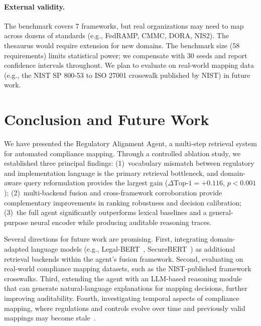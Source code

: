 \documentclass{sn-jnl}
\begin{document}
\paragraph{External validity.}
The benchmark covers 7 frameworks, but real organizations may need to map across dozens of standards (e.g., FedRAMP, CMMC, DORA, NIS2).
The thesaurus would require extension for new domains.
The benchmark size (58 requirements) limits statistical power; we compensate with 30 seeds and report confidence intervals throughout.
We plan to evaluate on real-world mapping data (e.g., the NIST SP 800-53 to ISO 27001 crosswalk published by NIST) in future work.


\section{Conclusion and Future Work}
\label{sec:conclusion}

We have presented the Regulatory Alignment Agent, a multi-step retrieval system for automated compliance mapping.
Through a controlled ablation study, we established three principal findings:
(1)~vocabulary mismatch between regulatory and implementation language is the primary retrieval bottleneck, and domain-aware query reformulation provides the largest gain ($\Delta\text{Top-1} = +0.116$, $p < 0.001$);
(2)~multi-backend fusion and cross-framework corroboration provide complementary improvements in ranking robustness and decision calibration;
(3)~the full agent significantly outperforms lexical baselines and a general-purpose neural encoder while producing auditable reasoning traces.

Several directions for future work are promising.
First, integrating domain-adapted language models (e.g., Legal-BERT~\cite{Chalkidis2020}, SecureBERT~\cite{Aghaei2022}) as additional retrieval backends within the agent's fusion framework.
Second, evaluating on real-world compliance mapping datasets, such as the NIST-published framework crosswalks.
Third, extending the agent with an LLM-based reasoning module that can generate natural-language explanations for mapping decisions, further improving auditability.
Fourth, investigating temporal aspects of compliance mapping, where regulations and controls evolve over time and previously valid mappings may become stale~\cite{Gama2014}.


\end{document}
